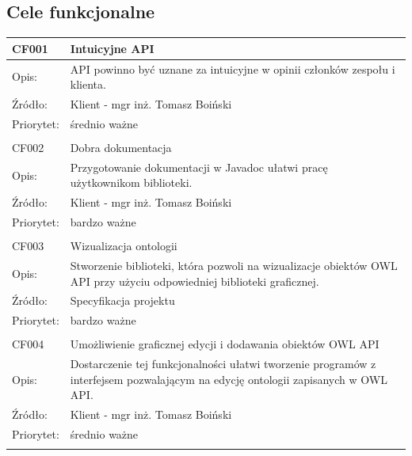 \documentclass[a4paper,10pt]{article}
\begin{document}
\subsection{Cele funkcjonalne}


\begin{center}

\begin{tabular}{|m{3cm}|m{9cm}|} \hline

CF001 & Intuicyjne API \\ \hline
Opis: & API powinno być uznane za intuicyjne w opinii członków zespołu i klienta. \\ \hline
Źródło: & Klient - mgr inż. Tomasz Boiński \\ \hline
Priorytet: & średnio ważne  \\ \hline
\multicolumn{2}{c}{} \\

 \hline
CF002 & Dobra dokumentacja \\ \hline
Opis: & Przygotowanie dokumentacji w Javadoc ułatwi pracę użytkownikom biblioteki. \\ \hline
Źródło: & Klient - mgr inż. Tomasz Boiński  \\ \hline
Priorytet: & bardzo ważne \\ \hline

\multicolumn{2}{c}{} \\
 \hline
CF003 & Wizualizacja ontologii \\ \hline
Opis: & Stworzenie biblioteki, która pozwoli na wizualizacje obiektów OWL API przy użyciu odpowiedniej biblioteki graficznej. \\ \hline
Źródło:  & Specyfikacja projektu  \\ \hline
Priorytet: & bardzo ważne \\ \hline

\multicolumn{2}{c}{} \\
 \hline
CF004 & Umożliwienie graficznej edycji i dodawania obiektów OWL API \\ \hline
Opis: &  Dostarczenie tej funkcjonalności ułatwi tworzenie programów z interfejsem pozwalającym na edycję ontologii zapisanych w OWL API. \\ \hline
Źródło: & Klient - mgr inż. Tomasz Boiński \\ \hline
Priorytet: & średnio ważne \\ \hline
\multicolumn{2}{c}{} \\



\end{tabular}
\end{center}
\end{document}

